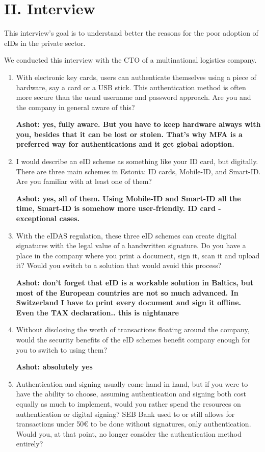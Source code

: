 \section*{II. Interview}
\label{appendix:interview}

This interview's goal is to understand better the reasons for the poor adoption of eIDs in the private sector.

We conducted this interview with the CTO of a multinational logistics company.

\begin{enumerate}
    \item With electronic key cards, users can authenticate themselves using a piece of hardware, say a card or a USB stick. This authentication method is often more secure than the usual username and password approach. Are you and the company in general aware of this?
    
    \textbf{Ashot: yes, fully aware. But you have to keep hardware always with you, besides that it can be lost or stolen. That's why MFA is a preferred way for authentications and it get global adoption.}
    \item I would describe an eID scheme as something like your ID card, but digitally. There are three main schemes in Estonia: ID cards, Mobile-ID, and Smart-ID. Are you familiar with at least one of them?
    
    \textbf{Ashot: yes, all of them. Using Mobile-ID and Smart-ID all the time, Smart-ID is somehow more user-friendly. ID card - exceptional cases.}
    \item With the eIDAS regulation, these three eID schemes can create digital signatures with the legal value of a handwritten signature. Do you have a place in the company where you print a document, sign it, scan it and upload it? Would you switch to a solution that would avoid this process?
    
    \textbf{Ashot: don't forget that eID is a workable solution in Baltics, but most of the European countries are not so much advanced. In Switzerland I have to print every document and sign it offline. Even the TAX declaration.. this is nightmare}
    \item Without disclosing the worth of transactions floating around the company, would the security benefits of the eID schemes benefit company enough for you to switch to using them?
    
    \textbf{Ashot: absolutely yes}
    \item Authentication and signing usually come hand in hand, but if you were to have the ability to choose, assuming authentication and signing both cost equally as much to implement, would you rather spend the resources on authentication or digital signing? SEB Bank used to or still allows for transactions under 50€ to be done without signatures, only authentication. Would you, at that point, no longer consider the authentication method entirely?
    

\end{enumerate}
